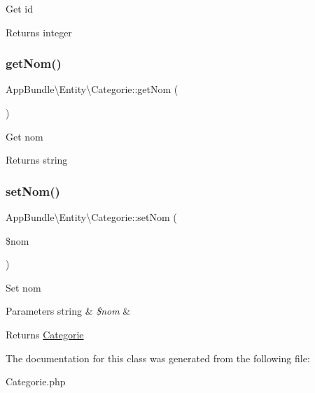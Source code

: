Get id

\begin{DoxyReturn}{Returns}
integer 
\end{DoxyReturn}
\mbox{\label{class_app_bundle_1_1_entity_1_1_categorie_aeae7080141a8c413f24c450c3c33816e}} 
\subsubsection{\texorpdfstring{get\+Nom()}{getNom()}}
{\footnotesize\ttfamily App\+Bundle\textbackslash{}\+Entity\textbackslash{}\+Categorie\+::get\+Nom (\begin{DoxyParamCaption}{ }\end{DoxyParamCaption})}

Get nom

\begin{DoxyReturn}{Returns}
string 
\end{DoxyReturn}
\mbox{\label{class_app_bundle_1_1_entity_1_1_categorie_a911c06661cd6a47473f0297a3543b83b}} 
\subsubsection{\texorpdfstring{set\+Nom()}{setNom()}}
{\footnotesize\ttfamily App\+Bundle\textbackslash{}\+Entity\textbackslash{}\+Categorie\+::set\+Nom (\begin{DoxyParamCaption}\item[{}]{\$nom }\end{DoxyParamCaption})}

Set nom


\begin{DoxyParams}[1]{Parameters}
string & {\em \$nom} & \\
\hline
\end{DoxyParams}
\begin{DoxyReturn}{Returns}
\hyperlink{class_app_bundle_1_1_entity_1_1_categorie}{Categorie} 
\end{DoxyReturn}


The documentation for this class was generated from the following file\+:\begin{DoxyCompactItemize}
\item 
Categorie.\+php\end{DoxyCompactItemize}
